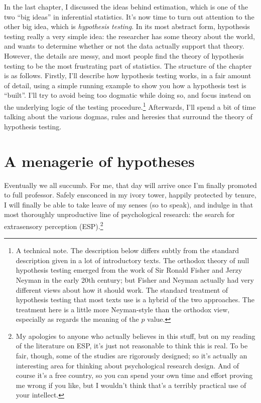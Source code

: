 \documentclass[
]{book}
\begin{document}
In the last chapter, I discussed the ideas behind estimation, which is one of the two ``big ideas'' in inferential statistics. It's now time to turn out attention to the other big idea, which is \emph{hypothesis testing}. In its most abstract form, hypothesis testing really a very simple idea: the researcher has some theory about the world, and wants to determine whether or not the data actually support that theory. However, the details are messy, and most people find the theory of hypothesis testing to be the most frustrating part of statistics. The structure of the chapter is as follows. Firstly, I'll describe how hypothesis testing works, in a fair amount of detail, using a simple running example to show you how a hypothesis test is ``built''. I'll try to avoid being too dogmatic while doing so, and focus instead on the underlying logic of the testing procedure.\footnote{A technical note. The description below differs subtly from the standard description given in a lot of introductory texts. The orthodox theory of null hypothesis testing emerged from the work of Sir Ronald Fisher and Jerzy Neyman in the early 20th century; but Fisher and Neyman actually had very different views about how it should work. The standard treatment of hypothesis testing that most texts use is a hybrid of the two approaches. The treatment here is a little more Neyman-style than the orthodox view, especially as regards the meaning of the \(p\) value.} Afterwards, I'll spend a bit of time talking about the various dogmas, rules and heresies that surround the theory of hypothesis testing.

\hypertarget{hypotheses}{%
\section{A menagerie of hypotheses}\label{hypotheses}}

Eventually we all succumb. For me, that day will arrive once I'm finally promoted to full professor. Safely ensconced in my ivory tower, happily protected by tenure, I will finally be able to take leave of my senses (so to speak), and indulge in that most thoroughly unproductive line of psychological research: the search for extrasensory perception (ESP).\footnote{My apologies to anyone who actually believes in this stuff, but on my reading of the literature on ESP, it's just not reasonable to think this is real. To be fair, though, some of the studies are rigorously designed; so it's actually an interesting area for thinking about psychological research design. And of course it's a free country, so you can spend your own time and effort proving me wrong if you like, but I wouldn't think that's a terribly practical use of your intellect.}
\end{document}
